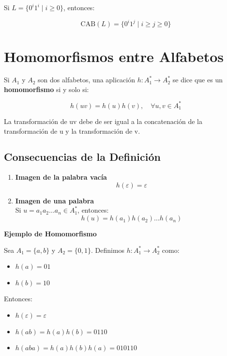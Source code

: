 \documentclass[12pt]{report} %
\begin{document}
\begin{ejemplo}
Si $L = \{0^i1^i \mid i \geq 0\}$, entonces:

$$
\text{CAB}(L) = \{0^i1^j \mid i \geq j \geq 0\}
$$
\end{ejemplo}

\hypertarget{homomorfismos-entre-alfabetos}{%
\section{Homomorfismos entre
Alfabetos}\label{homomorfismos-entre-alfabetos}}

\begin{definicion}
Si $A_1$ y $A_2$ son dos alfabetos, una aplicación $h : A_1^* \to A_2^*$ se dice que es un \textbf{homomorfismo} si y solo si:

$$
h(uv) = h(u)h(v), \quad \forall u, v \in A_1^*
$$

La transformación de uv debe de ser igual a la concatenación de la transformación de u y la transformación de v.
\end{definicion}

\hypertarget{consecuencias-de-la-definiciuxf3n}{%
\subsection{Consecuencias de la
Definición}\label{consecuencias-de-la-definiciuxf3n}}

\begin{enumerate}
\def\labelenumi{\arabic{enumi}.}
\item
  \textbf{Imagen de la palabra vacía}\\
  \[
   h(\varepsilon) = \varepsilon
   \]
\item
  \textbf{Imagen de una palabra}\\
  Si \(u = a_1a_2 \ldots a_n \in A_1^*\), entonces: \[
   h(u) = h(a_1)h(a_2) \ldots h(a_n)
   \]
\end{enumerate}

\begin{ejemplo}
    \textbf{Ejemplo de Homomorfismo}

    Sea $A_1 = \{a, b\}$ y $A_2 = \{0, 1\}$. Definimos $h : A_1^* \to A_2^*$ como:

    \begin{itemize}
        \item $h(a) = 01$
        \item $h(b) = 10$
    \end{itemize}

    Entonces:

    \begin{itemize}
        \item $h(\varepsilon) = \varepsilon$
        \item $h(ab) = h(a)h(b) = 0110$
        \item $h(aba) = h(a)h(b)h(a) = 010110$
    \end{itemize}
\end{ejemplo}
\end{document}
